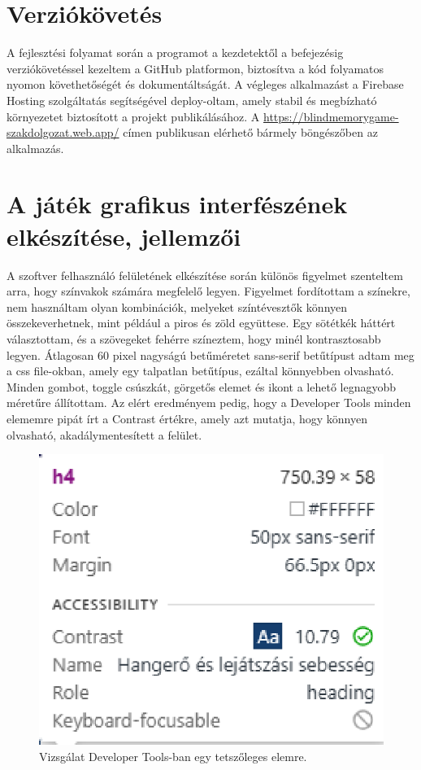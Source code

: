 \documentclass[12pt]{report}
\begin{document}
\section{Verziókövetés}
A fejlesztési folyamat során a programot a kezdetektől a befejezésig verziókövetéssel kezeltem a GitHub platformon, biztosítva a kód folyamatos nyomon követhetőségét és dokumentáltságát. A végleges alkalmazást a Firebase Hosting szolgáltatás segítségével deploy-oltam, amely stabil és megbízható környezetet biztosított a projekt publikálásához. A \url{https://blindmemorygame-szakdolgozat.web.app/} címen publikusan elérhető bármely böngészőben az alkalmazás.

\section{A játék grafikus interfészének elkészítése, jellemzői}
A szoftver felhasználó felületének elkészítése során különös figyelmet szenteltem arra, hogy színvakok számára megfelelő legyen. Figyelmet fordítottam a színekre, nem használtam olyan kombinációk, melyeket színtévesztők könnyen összekeverhetnek, mint például a piros és zöld együttese. Egy sötétkék háttért választottam, és a szövegeket fehérre színeztem, hogy minél kontrasztosabb legyen. Átlagosan 60 pixel nagyságú betűméretet  sans-serif betűtípust adtam meg a css file-okban, amely egy talpatlan betűtípus, ezáltal könnyebben olvasható. Minden gombot, toggle csúszkát, görgetős elemet és ikont a lehető legnagyobb méretűre állítottam. Az elért eredményem pedig, hogy a Developer Tools minden elememre pipát írt a Contrast értékre, amely azt mutatja, hogy könnyen olvasható, akadálymentesített a felület.
\begin{figure}[H]
  \centerline{\includegraphics[scale=1]{accessible.eps}}
  \caption{Vizsgálat Developer Tools-ban egy tetszőleges elemre.}
\end{figure}
\end{document}
